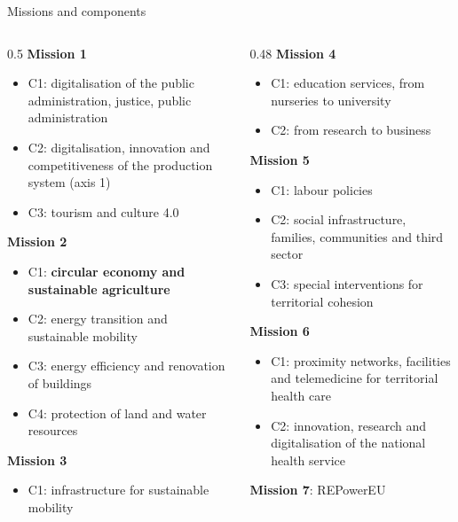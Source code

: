\documentclass[aspectratio=169,xcolor=table]{beamer}
\begin{document}
\begin{frame}{Missions and components}
\begin{columns}[T]
\begin{column}{0.5\textwidth}
\scriptsize\setlength{\itemsep}{0pt}
\textbf{Mission 1}
\begin{itemize}\setlength{\itemsep}{0pt}\setlength{\parskip}{0pt}
  \item C1: digitalisation of the public administration, justice, public administration
  \item C2: digitalisation, innovation and competitiveness of the production system (axis 1)
  \item C3: tourism and culture 4.0
\end{itemize}
\textbf{Mission 2}
\begin{itemize}\setlength{\itemsep}{0pt}\setlength{\parskip}{0pt}
  \item C1: \textbf{circular economy and sustainable agriculture}
  \item C2: energy transition and sustainable mobility
  \item C3: energy efficiency and renovation of buildings
  \item C4: protection of land and water resources
\end{itemize}
\textbf{Mission 3}
\begin{itemize}\setlength{\itemsep}{0pt}\setlength{\parskip}{0pt}
  \item C1: infrastructure for sustainable mobility
\end{itemize}
\end{column}
\begin{column}{0.48\textwidth}
\scriptsize\setlength{\itemsep}{0pt}
\textbf{Mission 4}
\begin{itemize}\setlength{\itemsep}{0pt}\setlength{\parskip}{0pt}
  \item C1: education services, from nurseries to university
  \item C2: from research to business
\end{itemize}
\textbf{Mission 5}
\begin{itemize}\setlength{\itemsep}{0pt}\setlength{\parskip}{0pt}
  \item C1: labour policies
  \item C2: social infrastructure, families, communities and third sector
  \item C3: special interventions for territorial cohesion
\end{itemize}
\textbf{Mission 6}
\begin{itemize}\setlength{\itemsep}{0pt}\setlength{\parskip}{0pt}
  \item C1: proximity networks, facilities and telemedicine for territorial health care
  \item C2: innovation, research and digitalisation of the national health service
\end{itemize}
\textbf{Mission 7}: REPowerEU
\end{column}
\end{columns}
\end{frame}
\end{document}

